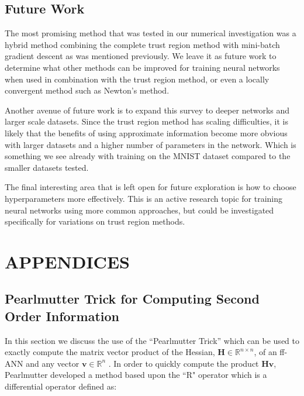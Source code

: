 \documentclass[letterpaper,12pt,titlepage,oneside,final]{book}
\begin{document}
	\section{Future Work}
	
	The most promising method that was tested in our numerical investigation was a hybrid method combining the complete trust region method with mini-batch gradient descent as was mentioned previously. We leave it as future work to determine what other methods can be improved for training neural networks when used in combination with the trust region method, or even a locally convergent method such as Newton's method.
	
	Another avenue of future work is to expand this survey to deeper networks and larger scale datasets. Since the trust region method has scaling difficulties, it is likely that the benefits of using approximate information become more obvious with larger datasets and a higher number of parameters in the network. Which is something we see already with training on the MNIST dataset compared to the smaller datasets tested.
	
	The final interesting area that is left open for future exploration is how to choose hyperparameters more effectively. This is an active research topic for training neural networks using more common approaches, but could be investigated specifically for variations on trust region methods. 
	
	\appendix
	
	\chapter*{APPENDICES}
	\section{Pearlmutter Trick for Computing Second Order Information}
	
	In this section we discuss the use of the ``Pearlmutter Trick'' which can be used to exactly compute the matrix vector product of the Hessian, $\mathbf{H} \in \mathbb{R}^{n\times n}$, of an ff-ANN and any vector $\mathbf{v} \in \mathbb{R}^{n}$ \cite{Pearlmutter.1993}. In order to quickly compute the product $\mathbf{Hv}$, Pearlmutter developed a method based upon the ``R" operator which is a differential operator \cite{Pearlmutter.1993} defined as:
	
\end{document}
